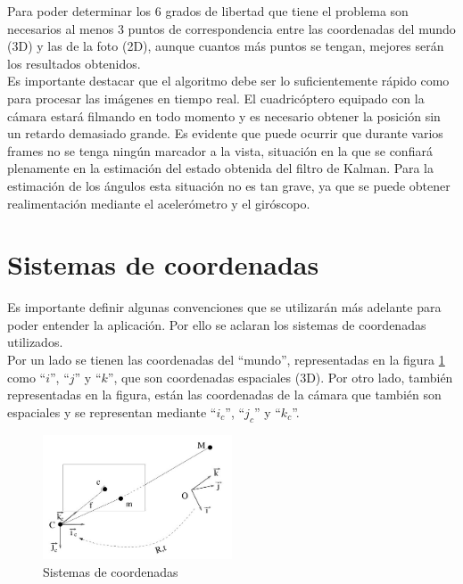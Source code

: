 \documentclass[main]{subfiles}
\begin{document}
Para poder determinar los 6 grados de libertad que tiene el problema son necesarios al menos 3 puntos de correspondencia entre las coordenadas del mundo (3D) y las de la foto (2D), aunque cuantos más puntos se tengan, mejores serán los resultados obtenidos.\\

Es importante destacar que el algoritmo debe ser lo suficientemente rápido como para procesar las imágenes en tiempo real. El cuadricóptero equipado con la cámara estará filmando en todo momento y es necesario obtener la posición sin un retardo demasiado grande. Es evidente que puede ocurrir que durante varios frames no se tenga ningún marcador a la vista, situación en la que se confiará plenamente en la estimación del estado obtenida del filtro de Kalman. Para la estimación de los ángulos esta situación no es tan grave, ya que se puede obtener realimentación mediante el acelerómetro y el giróscopo.

\section{Sistemas de coordenadas}

Es importante definir algunas convenciones que se utilizarán más adelante para poder entender la aplicación. Por ello se aclaran los sistemas de coordenadas utilizados.\\

Por un lado se tienen las coordenadas del ``mundo'', representadas en la figura \ref{fig:coordenadas} como ``$i$'', ``$j$'' y ``$k$'', que son coordenadas espaciales (3D). Por otro lado, también representadas en la figura, están las coordenadas de la cámara que también son espaciales y se representan mediante ``$i_c$'', ``$j_c$'' y ``$k_c$''.

\begin{figure}
	\begin{center}
		\includegraphics[width=0.5\textwidth]{./pics_camara/coordenadas.jpg}
	\end{center}
	\caption{Sistemas de coordenadas}
	\label{fig:coordenadas}
\end{figure}
\end{document}

